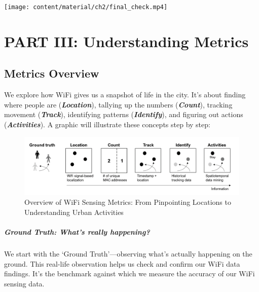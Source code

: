 \documentclass[
  letterpaper,
]{scrbook}
\begin{document}
\texttt{[image: content/material/ch2/final\_check.mp4]}

\part{PART III: Understanding Metrics}

\chapter{Metrics Overview}\label{metrics-overview}

We explore how WiFi gives us a snapshot of life in the city. It's about
finding where people are (\emph{\textbf{Location}}), tallying up the
numbers (\emph{\textbf{Count}}), tracking movement
(\emph{\textbf{Track}}), identifying patterns
(\emph{\textbf{Identify}}), and figuring out actions
(\emph{\textbf{Activities}}). A graphic will illustrate these concepts
step by step:

\begin{figure}[H]

{\centering \includegraphics{content/material/ch4/metric-overview.png}

}

\caption{Overview of WiFi Sensing Metrics: From Pinpointing Locations to
Understanding Urban Activities}

\end{figure}%

\subsubsection*{\texorpdfstring{\textbf{Ground Truth: What's really
happening?}}{Ground Truth: What's really happening?}}\label{ground-truth-whats-really-happening}

We start with the `Ground Truth'---observing what's actually happening
on the ground. This real-life observation helps us check and confirm our
WiFi data findings. It's the benchmark against which we measure the
accuracy of our WiFi sensing data.
\end{document}
